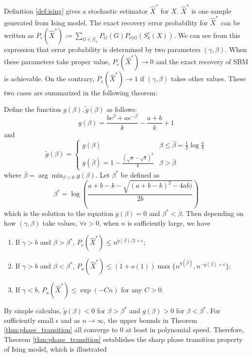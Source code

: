 \documentclass[entropy,article,submit,moreauthors,pdftex]{Definitions/mdpi}
\newcommand{\cG}{\mathcal{G}}
\newcommand{\1}{\mathbbm{1}}
\begin{document}
Definition \ref{def:ising} gives a stochastic estimator $\hat{X}^*$ for $X$. $\hat{X}^*$ is one sample generated from Ising model. The exact recovery error probability for $\hat{X}^*$ can be written as $P_e(\hat{X}^*) := \sum_{G \in \cG_n} P_G(G) P_{\sigma | G}(S^c_k(X))$. We can see from this expression that error probability is determined
by two parameters $(\gamma, \beta)$. When these parameters take proper value, $ P_e(\hat{X}^*)\to 0$ and the exact recovery of SBM is achievable. On the contrary, $P_e(\hat{X}^*) \to 1$ if $(\gamma, \beta)$ takes other values.
These two cases are summarized in the following theorem:
\begin{Theorem}\label{thm:phase_transition}
Define the function $g(\beta), \tilde{g}(\beta)$ as follows:
\begin{equation}
g(\beta) = \frac{be^{\beta} + a e^{-\beta}}{k} - \frac{a+b}{k} +1
\end{equation}
and
\begin{equation}
\tilde{g}(\beta) = \begin{cases}
g(\beta) & \beta \leq \bar{\beta} = \frac{1}{2}\log \frac{a}{b} \\
g(\bar{\beta}) = 1 - \frac{(\sqrt{a} - \sqrt{b})^2}{k} & \beta > \bar{\beta}
\end{cases}
\end{equation}
where $\bar{\beta} =  \arg\min_{\beta > 0} g(\beta)$.
Let $\beta^*$ be defined as
$$
\beta^* = \log(\frac{a + b - k - \sqrt{(a + b - k)^2 - 4 a b)}}{2  b})
$$
which is the solution to the equation $g(\beta) = 0$ and $\beta^* < \bar{\beta}$. Then depending on
how $(\gamma, \beta)$ take values, $\forall \epsilon > 0$, when $n$ is sufficiently large, we have
\begin{enumerate}
\item If $\gamma > b$ and $\beta > \beta^*$,  $P_e(\hat{X}^*) \leq n^{\tilde{g}(\beta)/2 + \epsilon}$;
\item If $\gamma > b$ and $\beta < \beta^*$, $P_a(\hat{X}^*) \leq (1+o(1))\max\{n^{g(\bar{\beta})}, n^{-g(\beta) + \epsilon}\}$;
\item If $\gamma < b$, $P_a(\hat{X}^*) \leq \exp(-C n)$ for any $C>0$.
\end{enumerate}
\end{Theorem}
By simple calculus, $\tilde{g}(\beta) < 0$ for $\beta> \beta^*$ and $g(\beta)>0$ for $\beta < \beta^*$.
For sufficiently small $\epsilon$ and as $n \to \infty$, the upper bounds in Theorem \ref{thm:phase_transition} all converge to $0$ at least
in polynomial speed.
Therefore, Theorem \ref{thm:phase_transition} establishes the sharp phase transition property of Ising model, which is illustrated
\end{document}
